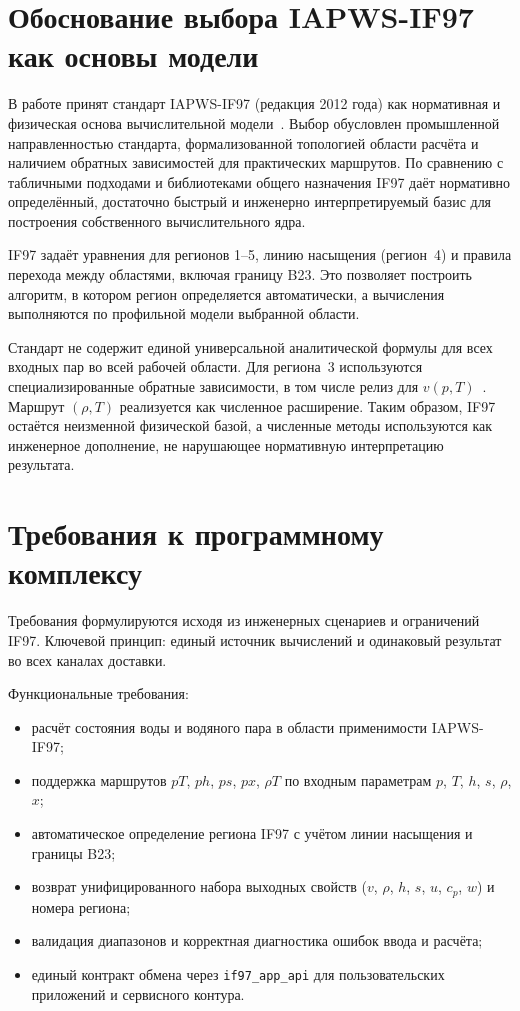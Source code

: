 \section{Обоснование выбора IAPWS-IF97 как основы модели}

В работе принят стандарт IAPWS-IF97 (редакция 2012 года) как нормативная
и физическая основа вычислительной модели~\cite{iapws_if97_2012}.
Выбор обусловлен промышленной направленностью стандарта,
формализованной топологией области расчёта
и наличием обратных зависимостей для практических маршрутов.
По сравнению с табличными подходами и библиотеками общего назначения
IF97 даёт нормативно определённый,
достаточно быстрый
и инженерно интерпретируемый базис для построения собственного вычислительного ядра.

IF97 задаёт уравнения для регионов 1--5, линию насыщения (регион~4)
и правила перехода между областями, включая границу B23.
Это позволяет построить алгоритм, в котором регион определяется автоматически,
а вычисления выполняются по профильной модели выбранной области.

Стандарт не содержит единой универсальной аналитической формулы для всех входных пар
во всей рабочей области.
Для региона~3 используются специализированные обратные зависимости,
в том числе релиз для $v(p,T)$~\cite{iapws_vpt_region3}.
Маршрут $(\rho, T)$ реализуется как численное расширение.
Таким образом, IF97 остаётся неизменной физической базой,
а численные методы используются как инженерное дополнение,
не нарушающее нормативную интерпретацию результата.

\section{Требования к программному комплексу}

Требования формулируются исходя из инженерных сценариев и ограничений IF97.
Ключевой принцип: единый источник вычислений и одинаковый результат
во всех каналах доставки.

Функциональные требования:
\begin{itemize}
\item расчёт состояния воды и водяного пара в области применимости IAPWS-IF97;
\item поддержка маршрутов $pT$, $ph$, $ps$, $px$, $\rho T$ по входным параметрам $p$, $T$, $h$, $s$, $\rho$, $x$;
\item автоматическое определение региона IF97 с учётом линии насыщения и границы B23;
\item возврат унифицированного набора выходных свойств ($v$, $\rho$, $h$, $s$, $u$, $c_p$, $w$) и номера региона;
\item валидация диапазонов и корректная диагностика ошибок ввода и расчёта;
\item единый контракт обмена через \texttt{if97\_app\_api} для пользовательских приложений и сервисного контура.
\end{itemize}

